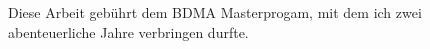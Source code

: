 Diese Arbeit gebührt dem BDMA Masterprogam, mit dem ich zwei abenteuerliche Jahre verbringen durfte. 
